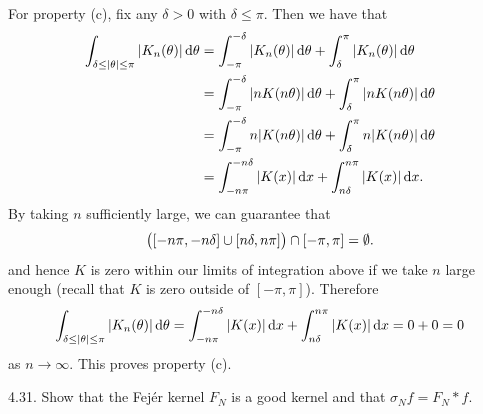 \documentclass{article}
\begin{document}
For property (c), fix any $\delta > 0$ with $\delta \leq \pi$. Then we
have that
%
\begin{align*}
    \int_{\delta \leq |\theta| \leq \pi} |K_n(\theta)| \dif \theta
        &=
        \int_{- \pi}^{-\delta} |K_n(\theta)| \dif \theta
        +
        \int_{\delta}^{\pi} |K_n(\theta)| \dif \theta
        \\
        &=
        \int_{- \pi}^{-\delta} |n K(n \theta)| \dif \theta
        +
        \int_{\delta}^{\pi} |n K(n \theta)| \dif \theta
        \\
        &=
        \int_{- \pi}^{-\delta} n |K(n \theta)| \dif \theta
        +
        \int_{\delta}^{\pi} n |K(n \theta)| \dif \theta
        \\
        &=
        \int_{- n \pi}^{-n \delta} |K(x)| \dif x
        +
        \int_{n \delta}^{n \pi} |K(x)| \dif x
    .
\end{align*}
%
By taking $n$ sufficiently large, we can guarantee that
%
\begin{equation*}
    \del{[- n \pi, - n \delta] \cup [n \delta, n \pi]} \cap [- \pi, \pi] = \emptyset
    .
\end{equation*}
%
and hence $K$ is zero within our limits of integration above if we take
$n$ large enough (recall that $K$ is zero outside of $[- \pi, \pi]$). Therefore
%
\begin{equation*}
    \int_{\delta \leq |\theta| \leq \pi} |K_n(\theta)| \dif \theta
        =
        \int_{- n \pi}^{-n \delta} |K(x)| \dif x
        +
        \int_{n \delta}^{n \pi} |K(x)| \dif x
        = 0 + 0 = 0
\end{equation*}
%
as $n \to \infty$. This proves property (c).

\newpage

4.31. Show that the Fejér kernel $F_N$ is a good kernel and that
$\sigma_N f = F_N * f$.
\end{document}
